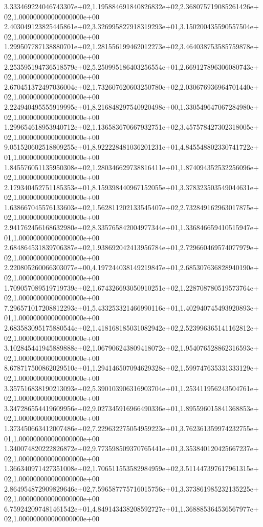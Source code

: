 3.333469224046743307e+02,1.195884691840826832e+02,2.368075719085261426e+02,1.000000000000000000e+00
2.403049123825445861e+02,3.326995827918319293e+01,3.150200435590557504e+02,1.000000000000000000e+00
1.299507787138880701e+02,1.281556199462012273e+02,3.464038753585759878e+02,1.000000000000000000e+00
2.253595194736518579e+02,5.250995186403256554e+01,2.669127896306080743e+02,1.000000000000000000e+00
2.670451372497036004e+02,1.732607620603250780e+02,2.030676936964701440e+02,1.000000000000000000e+00
2.224940495555919995e+01,8.216848297540920498e+00,1.330549647067284980e+02,1.000000000000000000e+00
1.299654618953940712e+02,1.136583670667932751e+02,3.457578427302318005e+02,1.000000000000000000e+00
9.051520602518809255e+01,8.922228481036201231e+01,4.845548802330741722e+01,1.000000000000000000e+00
1.845576051135950308e+02,1.280346629738816411e+01,1.874094352532256096e+02,1.000000000000000000e+00
2.179340452751185353e+01,8.159398440967152055e+01,3.378323503549044631e+02,1.000000000000000000e+00
1.638667045576133603e+02,1.562811202133545407e+02,2.732849162963017875e+02,1.000000000000000000e+00
2.941762456168632980e+02,8.335765842004977344e+01,1.336846659410515947e+01,1.000000000000000000e+00
2.684864531839706387e+02,1.938692042413956784e+01,2.729660469574077979e+02,1.000000000000000000e+00
2.220805260066303077e+00,4.197244038149219847e+01,2.685307636828940190e+02,1.000000000000000000e+00
1.709057089519719739e+02,1.674326693050910251e+02,1.228708780519573764e+02,1.000000000000000000e+00
7.296571017208812293e+01,5.433253321466990116e+01,1.402940745493920893e+01,1.000000000000000000e+00
2.683583095175880544e+02,1.418168185031082942e+02,2.523996365141162812e+02,1.000000000000000000e+00
3.102845441945889888e+02,1.067906243809418072e+02,1.954076528862316593e+02,1.000000000000000000e+00
8.678717500862029510e+01,1.294146507094629328e+02,1.599747635331333129e+02,1.000000000000000000e+00
3.357516838190213093e+02,5.390103906316903704e+01,1.253411956243504761e+02,1.000000000000000000e+00
3.347286554419609956e+02,9.027345916966490336e+01,1.895596015841368853e+02,1.000000000000000000e+00
1.373450663412007486e+02,7.229632275054959223e+01,3.762361359974232755e+01,1.000000000000000000e+00
1.340074820222826872e+02,9.773598509370765441e+01,3.353840120425667237e+02,1.000000000000000000e+00
1.366340971427351008e+02,1.706511553582984959e+02,3.511447397617961315e+02,1.000000000000000000e+00
2.864954872909829646e+02,7.596587775716015756e+01,3.373861985232135225e+02,1.000000000000000000e+00
6.759242097481461542e+01,4.849143438208592727e+01,1.368885364536567977e+02,1.000000000000000000e+00
